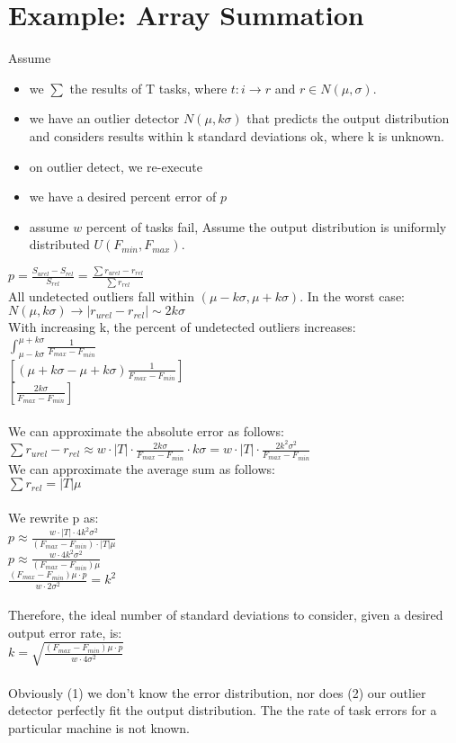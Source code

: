 \documentclass[11pt, oneside]{article}   	%
\begin{document}
\section {Example: Array Summation}
Assume
\begin{itemize}
	\item we $\sum$ the results of T tasks, where $t: i \rightarrow r$ and $r \in N(\mu, \sigma)$.
	\item we have an outlier detector $N(\mu, k\sigma)$ that predicts the output distribution and considers results within k standard deviations ok, where k is unknown. 
	\item on outlier detect, we re-execute
	\item we have a desired percent error of $p$
	\item assume $w$ percent of tasks fail, Assume the output distribution is uniformly distributed $U(F_{min}, F_{max})$.
\end{itemize}
$p = \frac {S_{urel} - S_{rel}} {S_{rel}} = \frac {\sum r_{urel} - r_{rel}} {\sum r_{rel}}$\\
All undetected outliers fall within $(\mu - k \sigma, \mu + k \sigma)$. In the worst case: $N(\mu, k\sigma) \rightarrow |r_{urel} - r_{rel}| \sim 2 k\sigma$\\
With increasing k, the percent of undetected outliers increases:\\
$\int_{\mu-k\sigma}^{\mu+k\sigma} \frac 1 {F_{max} - F_{min}}$\\
$[(\mu+k\sigma - \mu + k\sigma) \frac 1 {F_{max} - F_{min}}]$\\
$[\frac {2 k \sigma} {F_{max} - F_{min}}]$\\
\\
We can approximate the absolute error as follows:\\
$\sum r_{urel} - r_{rel} \approx w \cdot |T| \cdot \frac {2k \sigma} {F_{max} - F_{min}} \cdot k \sigma = w \cdot |T| \cdot \frac {2k^2 \sigma^2} {F_{max} - F_{min}}$\\
We can approximate the average sum as follows:\\
$\sum r_{rel} = |T| \mu$\\\\
We rewrite p as:\\
$p \approx \frac {w \cdot |T| \cdot 4k^2 \sigma^2} {(F_{max} - F_{min}) \cdot |T| \mu}$\\
$p \approx \frac {w \cdot 4k^2 \sigma^2} {(F_{max} - F_{min}) \mu}$\\
$\frac {(F_{max} - F_{min})\mu \cdot p} {w \cdot 2 \sigma^2}  = k^2$\\\\
Therefore, the ideal number of standard deviations to consider, given a desired output error rate, is:\\
$k = \sqrt{\frac {(F_{max} - F_{min})\mu \cdot p} {w \cdot 4 \sigma^2}}$\\\\
Obviously (1) we don't know the error distribution, nor does (2) our outlier detector perfectly fit the output distribution. The the rate of task errors for a particular machine is not known.
\end{document}
